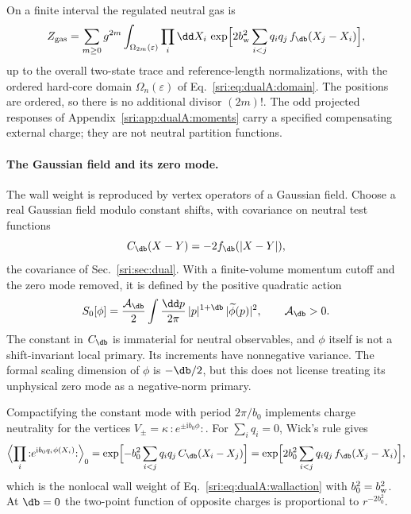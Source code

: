 On a finite interval the regulated neutral gas is
\begin{equation}
 Z_{\rm gas}=\sum_{m\ge0}g^{2m}\int_{\Omega_{2m}(\varepsilon)}\prod_i\dd X_i\,
 \exp\Bigl[2b_{\rm w}^2\sum_{i<j}q_iq_j\,f_{\db}(X_j-X_i)\Bigr],
\end{equation}
up to the overall two-state trace and reference-length normalizations, with the ordered hard-core domain
$\Omega_n(\varepsilon)$ of Eq.~\eqref{sri:eq:dualA:domain}. The positions are ordered, so there is no additional divisor
$(2m)!$. The odd projected responses of Appendix~\ref{sri:app:dualA:moments} carry a specified compensating external
charge; they are not neutral partition functions.

\paragraph{The Gaussian field and its zero mode.} The wall weight is reproduced by vertex operators of a Gaussian
field. Choose a real Gaussian field modulo constant shifts, with covariance on neutral test functions
\begin{equation}
 C_{\db}(X-Y)=-2f_{\db}(|X-Y|),
 \label{sri:eq:dualA:covariance}
\end{equation}
the covariance of Sec.~\ref{sri:sec:dual}. With a finite-volume momentum cutoff and the zero mode removed, it is defined
by the positive quadratic action
\begin{equation}
 S_0[\phi]=\frac{\mathcal A_{\db}}{2}\int\frac{\dd p}{2\pi}\,|p|^{1+\db}\,|\widetilde\phi(p)|^2,
 \qquad\mathcal A_{\db}>0.
\end{equation}
The constant in $C_{\db}$ is immaterial for neutral observables, and $\phi$ itself is not a shift-invariant local
primary. Its increments have nonnegative variance. The formal scaling dimension of $\phi$ is $-\db/2$, but this does
not license treating its unphysical zero mode as a negative-norm primary.

Compactifying the constant mode with period $2\pi/b_0$ implements charge neutrality for the vertices
$V_\pm=\kappa\,{:}e^{\pm\mathrm ib_0\phi}{:}$. For $\sum_iq_i=0$, Wick's rule gives
\begin{equation}
 \Bigl\langle\prod_i{:}e^{\mathrm ib_0q_i\phi(X_i)}{:}\Bigr\rangle_0
 =\exp\Bigl[-b_0^2\sum_{i<j}q_iq_j\,C_{\db}(X_i-X_j)\Bigr]
 =\exp\Bigl[2b_0^2\sum_{i<j}q_iq_j\,f_{\db}(X_j-X_i)\Bigr],
 \label{sri:eq:dualA:vertexgas}
\end{equation}
which is the nonlocal wall weight of Eq.~\eqref{sri:eq:dualA:wallaction} with $b_0^2=b_{\rm w}^2$. At $\db=0$ the
two-point function of opposite charges is proportional to $r^{-2b_0^2}$.

